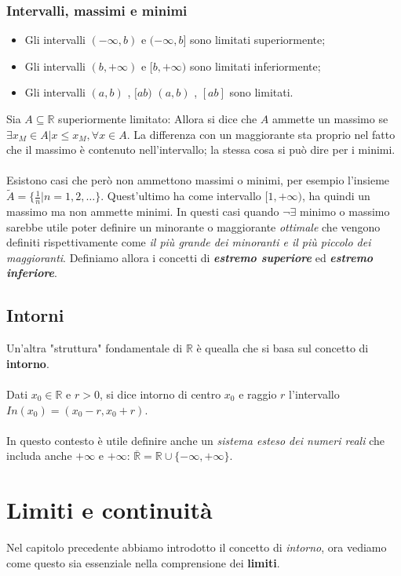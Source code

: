 \documentclass[x11names]{article}
\begin{document}
\subsubsection{Intervalli, massimi e minimi}
\begin{itemize}
    \item Gli intervalli $(-\infty,b) $ e $ (-\infty,b]$ sono limitati superiormente;
    \item Gli intervalli $(b, +\infty) $ e $ [b, +\infty)$ sono limitati inferiormente;
    \item Gli intervalli $(a,b) $ , $ [ab)$ $(a,b) $ , $ [ab]$ sono limitati.
\end{itemize}

\noindent
Sia $A \subseteq \mathbb{R}$ superiormente limitato:
Allora si dice che $A$ ammette un massimo se $\exists x_M \in A | x \leq x_M, \forall x \in A$. La differenza con un maggiorante sta proprio nel fatto che il massimo è contenuto nell'intervallo; la stessa cosa si può dire per i minimi. 
\\\\
\noindent
Esistono casi che però non ammettono massimi o minimi, per esempio l'insieme $\tilde{A} = \{ \frac{1}{n} | n = 1,2,\dots \}$. Quest'ultimo ha come intervallo $[1,+\infty)$, ha quindi un massimo ma non ammette minimi. In questi casi quando $\neg \exists$ minimo o massimo sarebbe utile poter definire un minorante o maggiorante \textit{ottimale} che vengono definiti rispettivamente come \textit{il più grande dei minoranti e il più piccolo dei maggioranti}. Definiamo allora i concetti di \textit{\textbf{estremo superiore}} ed \textit{\textbf{estremo inferiore}}.

\subsection{Intorni}
Un'altra  "struttura" fondamentale di $\mathbb{R}$ è quealla che si basa sul concetto di \textbf{intorno}.
\\\\
\noindent
Dati $x_0\in \mathbb{R} $ e $ r>0$, si dice intorno di centro $x_0$ e raggio $r$ l'intervallo $In(x_0) = (x_0 -r, x_0 +r)$.
\\\\
\noindent
In questo contesto è utile definire anche un \textit{sistema esteso dei numeri reali} che includa anche $+\infty $ e $ +\infty$: $\overline{\mathbb{R}} = \mathbb{R} \cup \{ -\infty,+\infty \}$. 

\newpage
\section{Limiti e continuità}
Nel capitolo precedente abbiamo introdotto il concetto di \textit{intorno}, ora vediamo come questo sia essenziale nella comprensione dei \textbf{limiti}.
\end{document}
